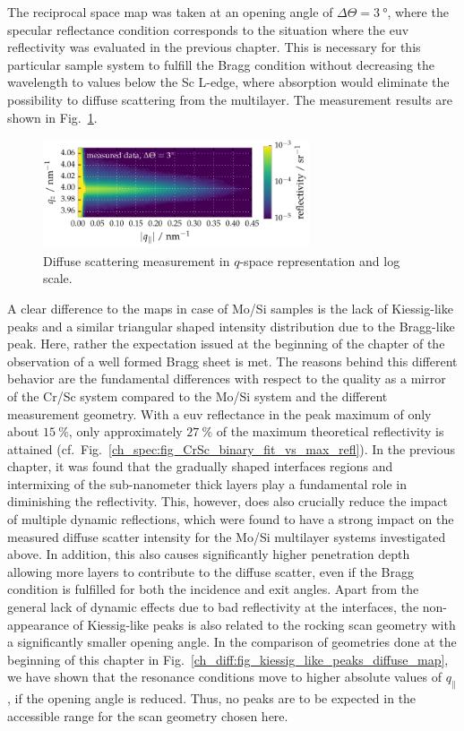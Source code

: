 The reciprocal space map was taken at an opening angle of $\Delta \Theta = \SI{3}{\degree}$, where the specular reflectance condition corresponds to the situation where the \gls{euv} reflectivity was evaluated in the previous chapter. This is necessary for this particular sample system to fulfill the Bragg condition without decreasing the wavelength to values below the Sc L-edge, where absorption would eliminate the possibility to diffuse scattering from the multilayer. The measurement results are shown in Fig.~\ref{ch_diff:fig_CrSc_diffuse_meas}.
\begin{figure}[htbp]
  \centering
  \includegraphics[width=0.7\textwidth]{img/CrSc_diffuse_measured}
  \caption{Diffuse scattering measurement in $q$-space representation and 
log scale.}
  \label{ch_diff:fig_CrSc_diffuse_meas}
\end{figure}
A clear difference to the maps in case of Mo/Si samples is the lack of Kiessig-like peaks and a similar triangular shaped intensity distribution due to the Bragg-like peak. Here, rather the expectation issued at the beginning of the chapter of the observation of a well formed Bragg sheet is met. The reasons behind this different behavior are the fundamental differences with respect to the quality as a mirror of the Cr/Sc system compared to the Mo/Si system and the different measurement geometry. With a \gls{euv} reflectance in the peak maximum of only about $\SI{15}{\percent}$, only approximately $\SI{27}{\percent}$ of the maximum theoretical reflectivity is attained (cf.~Fig.~\ref{ch_spec:fig_CrSc_binary_fit_vs_max_refl}). In the previous chapter, it was found that the gradually shaped interfaces regions and intermixing of the sub-nanometer thick layers play a fundamental role in diminishing the reflectivity. This, however, does also crucially reduce the impact of multiple dynamic reflections, which were found to have a strong impact on the measured diffuse scatter intensity for the Mo/Si multilayer systems investigated above. In addition, this also causes significantly higher penetration depth allowing more layers to contribute to the diffuse scatter, even if the Bragg condition is fulfilled for both the incidence and exit angles. Apart from the general lack of dynamic effects due to bad reflectivity at the interfaces, the non-appearance of Kiessig-like peaks is also related to the rocking scan geometry with a significantly smaller opening angle. In the comparison of geometries done at the beginning of this chapter in Fig.~\ref{ch_diff:fig_kiessig_like_peaks_diffuse_map}, we have shown that the resonance conditions move to higher absolute values of $q_\parallel$, if the opening angle is reduced. Thus, no peaks are to be expected in the accessible range for the scan geometry chosen here.


